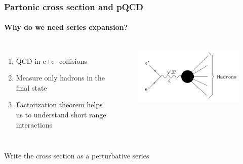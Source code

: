 \documentclass[aspectratio=43]{beamer}
\begin{document}
\begin{frame}

	\frametitle{Partonic cross section and pQCD}
	\framesubtitle{Why do we need series expansion?}
	\begin{columns}
		
		
		\begin{enumerate}
			\item QCD in e+e- collisions
			\item Measure only hadrons in the final state
			\item Factorization theorem helps us to understand short range interactions
		\end{enumerate}
		
		\begin{figure}[!htb]
			\includegraphics[width = \linewidth]{plots/ee_hadrons.png}
		\end{figure}
	
	\end{columns}

	Write the cross section as a perturbative series
	
\end{frame}
\end{document}
